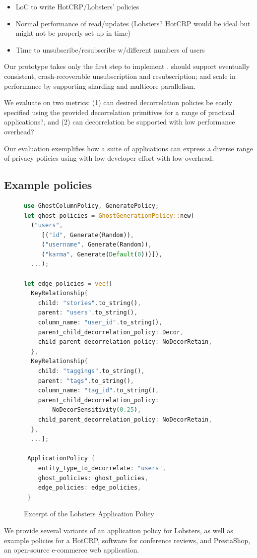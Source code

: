 \begin{itemize}
    \item LoC to write HotCRP/Lobsters' policies
    \item Normal performance of read/updates (Lobsters? HotCRP would be ideal but might not be
        properly set up in time)
    \item Time to unsubscribe/resubscribe w/different numbers of users
\end{itemize}
Our prototype takes only the first step to implement \sys. \sys should support eventually
consistent, crash-recoverable unsubscription and resubscription; and scale in performance by
supporting sharding and multicore parallelism.

\iffalse
We evaluate \sys on two metrics: (1) can desired decorrelation policies be easily specified using the
provided decorrelation primitives for a range of practical applications?, and (2) can decorrelation
be supported with low performance overhead?

Our evaluation exemplifies how a suite of applications can express a diverse
range of privacy policies using \sys with low developer effort with low overhead.

\subsection{Example policies}
\begin{figure}
\begin{lstlisting}[language=Rust]
use GhostColumnPolicy, GeneratePolicy;
let ghost_policies = GhostGenerationPolicy::new(
  ("users", 
     [("id", Generate(Random)),
     ("username", Generate(Random)),
     ("karma", Generate(Default(0)))]),
  ...);

let edge_policies = vec![
  KeyRelationship{
    child: "stories".to_string(),
    parent: "users".to_string(),
    column_name: "user_id".to_string(),
    parent_child_decorrelation_policy: Decor,
    child_parent_decorrelation_policy: NoDecorRetain,
  },
  KeyRelationship{
    child: "taggings".to_string(),
    parent: "tags".to_string(),
    column_name: "tag_id".to_string(),
    parent_child_decorrelation_policy: 
        NoDecorSensitivity(0.25),
    child_parent_decorrelation_policy: NoDecorRetain,
  },
  ...];

 ApplicationPolicy {
    entity_type_to_decorrelate: "users",
    ghost_policies: ghost_policies,
    edge_policies: edge_policies,
 }
\end{lstlisting}
    \label{fig:policy}
    \caption{Excerpt of the Lobsters Application Policy}
\end{figure}
We provide several variants of an application policy for Lobsters, as well as example policies for a
HotCRP, software for conference reviews, and PrestaShop, an
open-source e-commerce web application.


